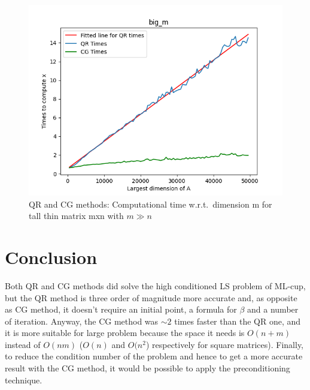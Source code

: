 \documentclass{article}
\begin{document}
        \begin{figure}
            \includegraphics[width=\linewidth]{../results/big_m.png}
            \caption{QR and CG methods: Computational time w.r.t.\ dimension m for tall thin matrix mxn with $m \gg n$}
            \label{big_m}
        \end{figure}


\section{Conclusion}\label{sec:conclusion}
Both QR and CG methods did solve the high conditioned LS problem of ML-cup, but the QR method is three order of magnitude more accurate and, as opposite as CG method, it doesn't require an initial point, a formula for $\beta$ and a number of iteration.
Anyway, the CG method was $\sim 2$ times faster than the QR one, and it is more suitable for large problem because the space it needs is $O(n+m)$ instead of $O(nm)$ ($O(n)$ and $O(n^{2}$) respectively for square matrices).
Finally, to reduce the condition number of the problem and hence to get a more accurate result with the CG method, it would be possible to apply the preconditioning technique.



\end{document}
